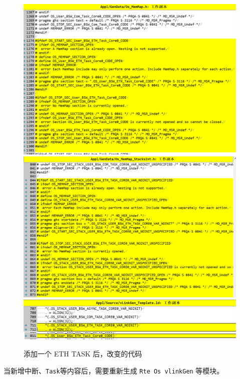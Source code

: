 \begin{figure}[htbp]
    \centering
    \includegraphics[scale=0.6]{pic/add_task_generate_mode_code_1.png}
    \includegraphics[scale=0.6]{pic/add_task_generate_mode_code_2.png}
    \includegraphics[scale=0.6]{pic/add_task_generate_mode_code_3.png}
    \caption{添加一个 ETH TASK 后，改变的代码}
    \label{fig:add_task_generate_mode_code}
\end{figure}

\begin{definition}[解决方案]
    当新增中断、\lstinline{Task}等内容后，需要重新生成 \lstinline{Rte Os vlinkGen} 等模块。
\end{definition}

